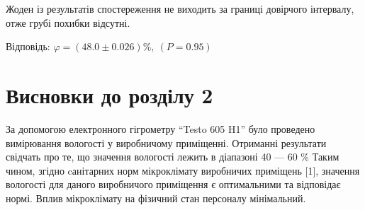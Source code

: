 Жоден із результатів спостереження не виходить за границі довірчого інтервалу, отже грубі похибки відсутні.

Відповідь: $\varphi = (48.0 \pm 0.026)\%,~(P=0.95)$

\section*{Висновки до розділу 2}

За допомогою електронного гігрометру ``Testo 605 H1'' було проведено вимірювання вологості у
виробничому приміщенні.  Отриманні результати свідчать про те, що значення вологості лежить в
діапазоні 40 --- 60 \% Таким чином, згідно cанітарних норм мікроклімату виробничих
приміщень [1], значення вологості для даного виробничого приміщення є оптимальними та відповідає
нормі.  Вплив мікроклімату на фізичний стан персоналу мінімальний.
